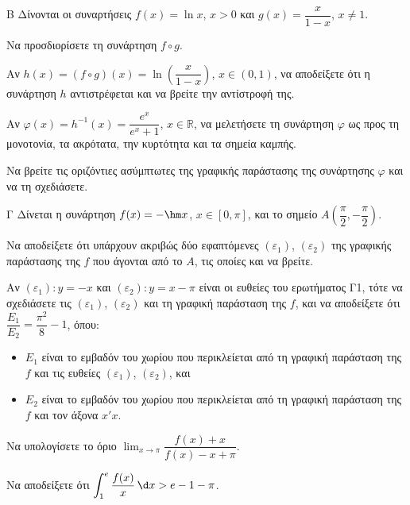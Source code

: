 \begin{thema}{Β}
Δίνονται οι συναρτήσεις $f(x) = \ln x$, $x > 0$ και $g(x) = \dfrac{x}{1-x}$, $x \neq 1$.
\begin{erwthma}
    \item Να προσδιορίσετε τη συνάρτηση $f \circ g$. 
    \item Αν $h(x) = (f \circ g)(x) = \ln\!\left(\dfrac{x}{1-x}\right)$, $x \in (0, 1)$, να αποδείξετε ότι η συνάρτηση $h$ αντιστρέφεται και να βρείτε την αντίστροφή της. 
    \item Αν $\varphi(x) = h^{-1}(x) = \dfrac{e^x}{e^x + 1}$, $x \in \mathbb{R}$, να μελετήσετε τη συνάρτηση $\varphi$ ως προς τη μονοτονία, τα ακρότατα, την κυρτότητα και τα σημεία καμπής. 
    \item Να βρείτε τις οριζόντιες ασύμπτωτες της γραφικής παράστασης της συνάρτησης $\varphi$ και να τη σχεδιάσετε. 
\end{erwthma}
\end{thema}
\begin{thema}{Γ}
Δίνεται η συνάρτηση $f(x) = -\hm x$, $x \in [0, \pi]$, και το σημείο $A\!\left(\dfrac{\pi}{2}, -\dfrac{\pi}{2}\right)$.
\begin{erwthma}
    \item Να αποδείξετε ότι υπάρχουν ακριβώς δύο εφαπτόμενες $(\varepsilon_1)$, $(\varepsilon_2)$ της γραφικής παράστασης της $f$ που άγονται από το $A$, τις οποίες και να βρείτε. 
    \item Αν $(\varepsilon_1): y = -x$ και $(\varepsilon_2): y = x - \pi$ είναι οι ευθείες του ερωτήματος Γ1, τότε να σχεδιάσετε τις $(\varepsilon_1)$, $(\varepsilon_2)$ και τη γραφική παράσταση της $f$, και να αποδείξετε ότι $\dfrac{E_1}{E_2} = \dfrac{\pi^2}{8} - 1$, όπου:
    \begin{itemize}
        \item $E_1$ είναι το εμβαδόν του χωρίου που περικλείεται από τη γραφική παράσταση της $f$ και τις ευθείες $(\varepsilon_1)$, $(\varepsilon_2)$, και
        \item $E_2$ είναι το εμβαδόν του χωρίου που περικλείεται από τη γραφική παράσταση της $f$ και τον άξονα $x'x$.
    \end{itemize}
    \item Να υπολογίσετε το όριο $\displaystyle\lim_{x \to \pi} \dfrac{f(x) + x}{f(x) - x + \pi}$. 
    \item Να αποδείξετε ότι $\displaystyle\int_1^e \dfrac{f(x)}{x}\,\d x > e - 1 - \pi$. 
\end{erwthma}
\end{thema}

